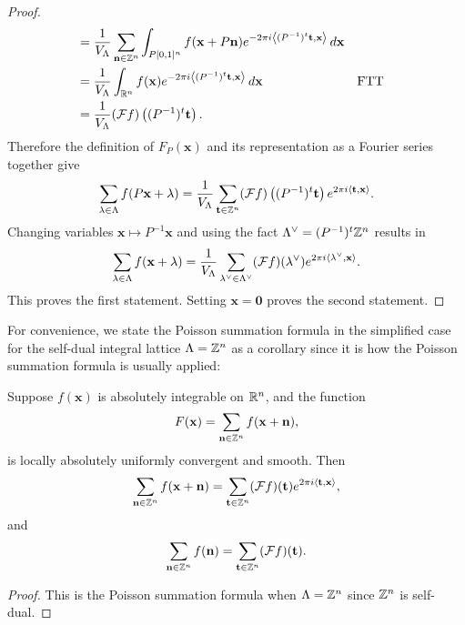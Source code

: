 \begin{proof}
\begin{align*}
          &= \frac{1}{V_{\Lambda}}\sum_{\mathbf{n} \in \mathbb{Z}^{n}}\int_{P[0,1]^{n}}f(\mathbf{x}+P\mathbf{n})e^{-2\pi i\left\langle(P^{-1})^{t}\mathbf{t},\mathbf{x}\right\rangle}\,d\mathbf{x} \\
          &= \frac{1}{V_{\Lambda}}\int_{\mathbb{R}^{n}}f(\mathbf{x})e^{-2\pi i\left\langle(P^{-1})^{t}\mathbf{t},\mathbf{x}\right\rangle}\,d\mathbf{x} && \text{FTT} \\
          &= \frac{1}{V_{\Lambda}}(\mathcal{F}f)\left((P^{-1})^{t}\mathbf{t}\right).
        \end{align*}
        Therefore the definition of $F_{P}(\mathbf{x})$ and its representation as a Fourier series together give
        \[
          \sum_{\lambda \in \Lambda}f(P\mathbf{x}+\lambda) = \frac{1}{V_{\Lambda}}\sum_{\mathbf{t} \in \mathbb{Z}^{n}}(\mathcal{F}f)\left((P^{-1})^{t}\mathbf{t}\right)e^{2\pi i\langle\mathbf{t},\mathbf{x}\rangle}.
        \]
        Changing variables $\mathbf{x} \mapsto P^{-1}\mathbf{x}$ and using the fact $\Lambda^{\vee} = (P^{-1})^{t}\mathbb{Z}^{n}$ results in
        \[
          \sum_{\lambda \in \Lambda}f(\mathbf{x}+\lambda) = \frac{1}{V_{\Lambda}}\sum_{\lambda^{\vee} \in \Lambda^{\vee}}(\mathcal{F}f)(\lambda^{\vee})e^{2\pi i\langle\lambda^{\vee},\mathbf{x}\rangle}.
        \]
        This proves the first statement. Setting $\mathbf{x} = \mathbf{0}$ proves the second statement.
      \end{proof}

      For convenience, we state the Poisson summation formula in the simplified case for the self-dual integral lattice $\Lambda = \mathbb{Z}^{n}$ as a corollary since it is how the Poisson summation formula is usually applied:

      \begin{corollary}
        Suppose $f(\mathbf{x})$ is absolutely integrable on $\mathbb{R}^{n}$, and the function
        \[
          F(\mathbf{x}) = \sum_{\mathbf{n} \in \mathbb{Z}^{n}}f(\mathbf{x}+\mathbf{n}),
        \]
        is locally absolutely uniformly convergent and smooth. Then
        \[
          \sum_{\mathbf{n} \in \mathbb{Z}^{n}}f(\mathbf{x}+\mathbf{n}) = \sum_{\mathbf{t} \in \mathbb{Z}^{n}}(\mathcal{F}f)(\mathbf{t})e^{2\pi i\langle\mathbf{t},\mathbf{x}\rangle},
        \]
        and
        \[
          \sum_{\mathbf{n} \in \mathbb{Z}^{n}}f(\mathbf{n}) = \sum_{\mathbf{t} \in \mathbb{Z}^{n}}(\mathcal{F}f)(\mathbf{t}).
        \]
      \end{corollary}
      \begin{proof}
        This is the Poisson summation formula when $\Lambda = \mathbb{Z}^{n}$ since $\mathbb{Z}^{n}$ is self-dual.
      \end{proof}

